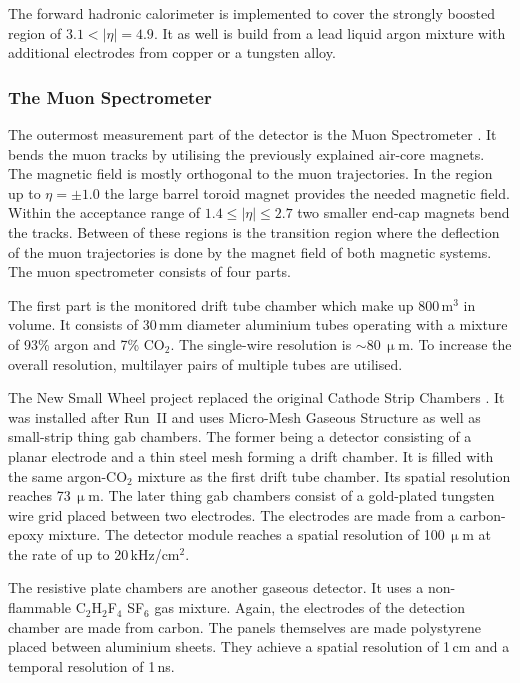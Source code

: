 \documentclass[bachelor,ngerman,english]{GAUBM}
\begin{document}
The forward hadronic calorimeter \cite{atlas:tech_design_report_01} is implemented to cover the strongly boosted region of $3.1<|\eta|=4.9$. It as well is build from a lead liquid argon mixture with additional electrodes from copper or a tungsten alloy.

\subsubsection*{The Muon Spectrometer}
The outermost measurement part of the \atlas detector is the Muon Spectrometer \cite{atlas:tech_design_report_01,atlas:muon_chamber}. It bends the muon tracks by utilising the previously explained air-core magnets. The magnetic field is mostly orthogonal to the muon trajectories. In the region up to $\eta=\pm1.0$ the large barrel toroid magnet provides the needed magnetic field. Within the acceptance range of $1.4\leq|\eta|\leq2.7$ two smaller end-cap magnets bend the tracks. Between of these regions is the transition region where the deflection of the muon trajectories is done by the magnet field of both magnetic systems. The muon spectrometer consists of four parts.

The first part is the monitored drift tube chamber which make up 800\,m$^3$ in volume. It consists of 30\,mm diameter aluminium tubes operating with a mixture of 93\% argon and 7\% CO$_2$. The single-wire resolution is $\sim$80\,$\upmu$m. To increase the overall resolution, multilayer pairs of multiple tubes are utilised.

The New Small Wheel project replaced the original Cathode Strip Chambers \cite{atlas:muon_chamber,atlas:muon_chamber_upgrade,atlas:new_small_wheel}. It was installed after Run~II and uses Micro-Mesh Gaseous Structure as well as small-strip thing gab chambers. The former being a detector consisting of a planar electrode and a thin steel mesh forming a drift chamber. It is filled with the same argon-CO$_2$ mixture as the first drift tube chamber. Its spatial resolution reaches 73\,$\upmu$m. The later thing gab chambers consist of a gold-plated tungsten wire grid placed between two electrodes. The electrodes are made from a carbon-epoxy mixture. The detector module reaches a spatial resolution of 100\,$\upmu$m at the rate of up to 20\,kHz/cm$^2$.

The resistive plate chambers \cite{atlas:tech_design_report_01,atlas:muon_chamber,atlas:muon_chamber_upgrade} are another gaseous detector. It uses a non-flammable C$_2$H$_2$F$_4$ SF$_6$ gas mixture. Again, the electrodes of the detection chamber are made from carbon. The panels themselves are made polystyrene placed between aluminium sheets. They achieve a spatial resolution of 1\,cm and a temporal resolution of 1\,ns.
\end{document}
